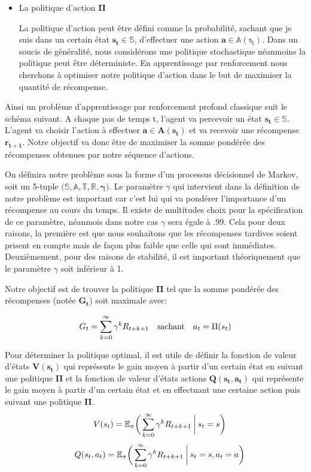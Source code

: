\begin{itemize}
    \item La politique d'action $\bm{\Pi}$
    
    La politique d'action peut être défini comme la probabilité, sachant que je suis dans un certain état $\bm{s_t \in \mathbb{S}}$, d'effectuer une action $\bm{a \in \mathbb{A(s_t)}}$.
    Dans un soucis de généralité, nous considérons une politique stochastique néanmoins la politique peut être déterministe. En apprentissage par renforcement nous cherchons à optimiser notre politique d'action dans le but de maximiser la quantité de récompense.
        

\end{itemize}

Ainsi un problème d'apprentissage par renforcement profond classique suit le schéma suivant. A chaque pas de temps t, l'agent va percevoir un état $\bm{s_t \in \mathbb{S}}$. L'agent va choisir l'action à effectuer $\bm{a \in A(s_t)}$ et va recevoir une récompense $\bm{r_{t+1}}$. Notre objectif va donc être de maximiser la somme pondérée des récompenses obtenues par notre séquence d'actions. 


On définira notre problème sous la forme d'un processus décisionnel de Markov, soit un 5-tuple $\bm{\big(\mathbb{S}, \mathbb{A}, \mathbb{T}, \mathbb{R}, \gamma \big)}$. Le paramètre $\gamma$ qui intervient dans la définition de notre problème est important car c'est lui qui va pondérer l'importance d'un récompense au cours du temps. Il existe de multitudes choix pour la spécification de ce paramètre, néanmois dans notre cas $\gamma$ sera égale à .99. Cela pour deux raisons, la première est que nous souhaitons que les récompenses tardives soient prisent en compte mais de façon plus faible que celle qui sont immédiates. Deuxièmement, pour des raisons de stabilité, il est important théoriquement que le paramètre $\gamma$ soit inférieur à 1.


Notre objectif est de trouver la politique $\bm{\Pi}$ tel que la somme pondérée des récompenses (notée $\bm{G_t}$) soit maximale avec:

\begin{align}
G_t = \sum_{k=0}^{\infty} \gamma^kR_{t+k+1} \quad \text{sachant} \quad a_t = \Pi(s_t)
\end{align}

Pour déterminer la politique optimal, il est utile de définir la fonction de valeur d'états $\bm{V(s_t)}$ qui représente le gain moyen à partir d'un certain état en suivant une  politique $\bm{\Pi}$ et la fonction de valeur d'états actions $\bm{Q(s_t, a_t)}$ qui représente le gain moyen à partir d'un certain état et en effectuant une certaine action puis suivant une  politique $\bm{\Pi}$.
\begin{gather}
\quad V(s_t) = \mathbb{E_\pi}\bigg(\sum_{k=0}^{\infty} \gamma^kR_{t+k+1} \:\bigg\vert\: s_t=s \bigg) \\[.1cm]
\quad  Q(s_t,a_t) = \mathbb{E_\pi}\bigg(\sum_{k=0}^{\infty} \gamma^kR_{t+k+1} \:\bigg\vert\: s_t=s, a_t=a \bigg)
\end{gather}


